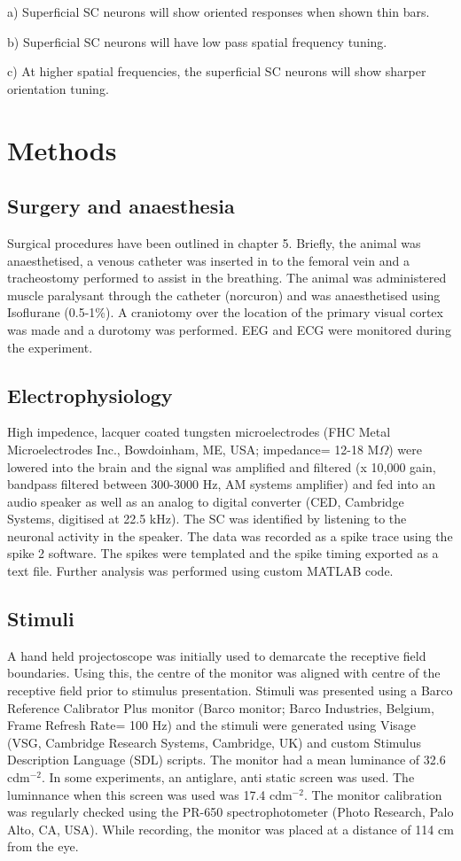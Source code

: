 \documentclass [12pt]{report}
\begin{document}
a) Superficial SC neurons will show oriented responses when shown thin bars.

b) Superficial SC neurons will have low pass spatial frequency tuning.

c) At higher spatial frequencies, the superficial SC neurons will show sharper orientation tuning.

\section{Methods}

\subsection{Surgery and anaesthesia}

Surgical procedures have been outlined in chapter 5. Briefly, the animal was anaesthetised, a venous catheter was inserted in to the femoral vein and a tracheostomy performed to assist in the breathing. The animal was administered muscle paralysant through the catheter (norcuron) and was anaesthetised using Isoflurane (0.5-1\%). A craniotomy over the location of the primary visual cortex was made and a durotomy was performed. EEG and ECG were monitored during the experiment.
\subsection{Electrophysiology}
 High impedence, lacquer coated tungsten microelectrodes (FHC Metal Microelectrodes Inc., Bowdoinham, ME, USA; impedance= 12-18 M$\Omega$) were lowered into the brain and the signal was amplified and filtered (x 10,000 gain, bandpass filtered between 300-3000 Hz, AM systems amplifier) and fed into an audio speaker as well as an analog to digital converter (CED, Cambridge Systems, digitised at 22.5 kHz). The SC was identified by listening to the neuronal activity in the speaker. The data was recorded as a spike trace using the spike 2 software. The spikes were templated and the spike timing exported as a text file. Further analysis was performed using custom MATLAB code.

\subsection{Stimuli}

A hand held projectoscope was initially used to demarcate the receptive field boundaries. Using this, the centre of the monitor was aligned with centre of the receptive field prior to stimulus presentation. Stimuli was presented using a Barco Reference Calibrator Plus monitor (Barco monitor; Barco Industries, Belgium, Frame Refresh Rate= 100 Hz) and the stimuli were generated using Visage (VSG, Cambridge Research Systems, Cambridge, UK) and custom Stimulus Description Language (SDL) scripts. The monitor had a mean luminance of 32.6 cdm$^{-2}$. In some experiments, an antiglare, anti static screen was used. The luminnance when this screen was used was 17.4 cdm$^{-2}$. The monitor calibration was regularly checked using the PR-650 spectrophotometer (Photo Research, Palo Alto, CA, USA). While recording, the monitor was placed at a distance of 114 cm from the eye.
\end{document}
